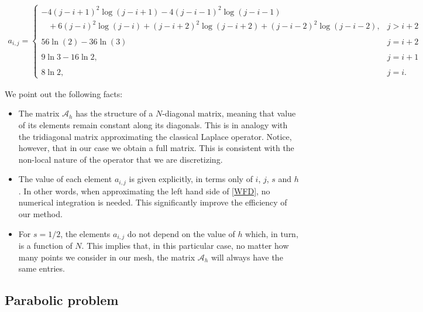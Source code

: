 \begin{align*}
	a_{i,j} = \begin{cases}
					-4(j-i+1)^2\log(j-i+1)-4(j-i-1)^2\log(j-i-1)
					\\
					\;\;\;+6(j-i)^2\log(j-i)+(j-i+2)^2\log(j-i+2)+(j-i-2)^2\log(j-i-2), & \displaystyle j> i+2
					\\
					\\
					56\ln(2)-36\ln(3) & \displaystyle j= i+2	
					\\
					\\
					9\ln 3-16\ln 2, & \displaystyle j=i+1
					\\
					\\
					8\ln 2, & \displaystyle j=i.
				\end{cases}	
\end{align*}

\begin{remark}
We point out the following facts:
\begin{itemize}
	\item The matrix $\mathcal A_h$ has the structure of a $N$-diagonal matrix, meaning that value of its elements remain constant along its diagonals. This is in analogy with the tridiagonal matrix approximating the classical Laplace operator. Notice, however, that in our case we obtain a full matrix. This is consistent with the non-local nature of the operator that we are discretizing.
	
	\item The value of each element $a_{i,j}$ is given explicitly, in terms only of $i$, $j$, $s$ and $h$. In other words, when approximating the left hand side of \eqref{WFD}, no numerical integration is needed. This significantly improve the efficiency of our method.
	
	\item For $s=1/2$, the elements $a_{i,j}$ do not depend on the value of $h$ which, in turn, is a function of $N$. This implies that, in this particular case, no matter how many points we consider in our mesh, the matrix $\mathcal A_h$ will always have the same entries. 
\end{itemize}
\end{remark}

\subsection{Parabolic problem}

